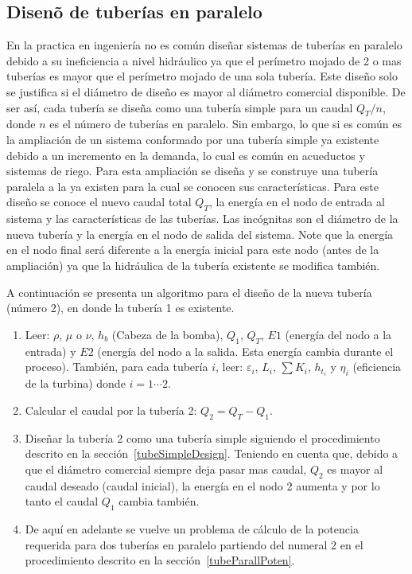 \documentclass[11pt, oneside]{article}
\begin{document}
\subsection{Disen\~o de  tuber\'ias en paralelo}
En la practica en ingenier\'ia no es com\'un dise\~nar sistemas de tuber\'ias en paralelo debido a su ineficiencia a nivel hidr\'aulico ya que el per\'imetro mojado de 2 o mas tuber\'ias es mayor que el per\'imetro mojado de una sola tuber\'ia. Este dise\~no solo se justifica si el di\'ametro de dise\~no es mayor al di\'ametro comercial disponible. De ser as\'i, cada tuber\'ia se dise\~na como una tuber\'ia simple para un caudal $Q_T/n$, donde $n$ es el n\'umero de tuber\'ias en paralelo. Sin embargo, lo que si es com\'un es la ampliaci\'on de un sistema conformado por una tuber\'ia simple ya existente debido a un incremento en la demanda, lo cual es com\'un en acueductos y sistemas de riego. Para esta ampliaci\'on se dise\~na y se construye una tuber\'ia paralela a la ya existen para la cual se conocen sus caracter\'isticas. Para este dise\~no se conoce el nuevo caudal total $Q_T$, la energ\'ia en el nodo de entrada al sistema y las caracter\'isticas de las tuber\'ias. Las inc\'ognitas son el di\'ametro de la nueva tuber\'ia y la energ\'ia en el nodo de salida del sistema. Note que la energ\'ia en el nodo final ser\'a diferente a la energ\'ia inicial para este nodo (antes de la ampliaci\'on) ya que la hidr\'aulica de la tuber\'ia existente se modifica tambi\'en.

A continuaci\'on se presenta un algoritmo para el dise\~no de la nueva tuber\'ia (n\'umero 2), en donde la tuber\'ia 1 es existente.

\begin{enumerate}
\item Leer: $\rho$, $\mu$ o $\nu$, $h_b$ (Cabeza de la bomba), $Q_1$, $Q_T$, $E1$ (energ\'ia del nodo a la entrada) y $E2$ (energ\'ia del nodo a la salida. Esta energ\'ia cambia durante el proceso). Tambi\'en, para cada tuber\'ia $i$, leer: $\varepsilon_i$, $L_i$, $\sum K_i$, $h_{t_i}$ y $\eta_i$ (eficiencia de la turbina) donde $i=1 \cdots 2$.
\item Calcular el caudal por la tuber\'ia 2: $Q_2 = Q_T - Q_1$.
\item Dise\~nar la tuber\'ia 2 como una tuber\'ia simple siguiendo el procedimiento descrito en la secci\'on~\ref{tubeSimpleDesign}. Teniendo en cuenta que, debido a que el di\'ametro comercial siempre deja pasar mas caudal, $Q_2$ es mayor al caudal deseado (caudal inicial), la energ\'ia en el nodo 2 aumenta y por lo tanto el caudal $Q_1$ cambia tambi\'en.
\item De aqu\'i en adelante se vuelve un problema de c\'alculo de la potencia requerida para dos tuber\'ias en paralelo partiendo del numeral 2 en el procedimiento descrito en la secci\'on~\ref{tubeParallPoten}. 
\end{enumerate}
\end{document}
